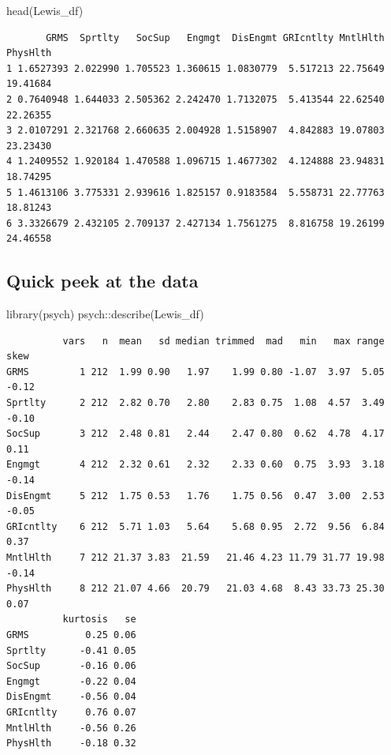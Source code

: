 \documentclass[
  11pt,
]{book}
\newenvironment{Shaded}{\begin{snugshade}}{\end{snugshade}}
\newcommand{\FunctionTok}[1]{\textcolor[rgb]{0.00,0.00,0.00}{#1}}
\newcommand{\NormalTok}[1]{#1}
\newcommand{\SpecialCharTok}[1]{\textcolor[rgb]{0.00,0.00,0.00}{#1}}
\begin{document}
\begin{Shaded}
\begin{Highlighting}[]
\FunctionTok{head}\NormalTok{(Lewis\_df)}
\end{Highlighting}
\end{Shaded}

\begin{verbatim}
       GRMS  Sprtlty   SocSup   Engmgt  DisEngmt GRIcntlty MntlHlth PhysHlth
1 1.6527393 2.022990 1.705523 1.360615 1.0830779  5.517213 22.75649 19.41684
2 0.7640948 1.644033 2.505362 2.242470 1.7132075  5.413544 22.62540 22.26355
3 2.0107291 2.321768 2.660635 2.004928 1.5158907  4.842883 19.07803 23.23430
4 1.2409552 1.920184 1.470588 1.096715 1.4677302  4.124888 23.94831 18.74295
5 1.4613106 3.775331 2.939616 1.825157 0.9183584  5.558731 22.77763 18.81243
6 3.3326679 2.432105 2.709137 2.427134 1.7561275  8.816758 19.26199 24.46558
\end{verbatim}

\hypertarget{quick-peek-at-the-data}{%
\subsection{Quick peek at the data}\label{quick-peek-at-the-data}}

\begin{Shaded}
\begin{Highlighting}[]
\FunctionTok{library}\NormalTok{(psych)}
\NormalTok{psych}\SpecialCharTok{::}\FunctionTok{describe}\NormalTok{(Lewis\_df)}
\end{Highlighting}
\end{Shaded}

\begin{verbatim}
          vars   n  mean   sd median trimmed  mad   min   max range  skew
GRMS         1 212  1.99 0.90   1.97    1.99 0.80 -1.07  3.97  5.05 -0.12
Sprtlty      2 212  2.82 0.70   2.80    2.83 0.75  1.08  4.57  3.49 -0.10
SocSup       3 212  2.48 0.81   2.44    2.47 0.80  0.62  4.78  4.17  0.11
Engmgt       4 212  2.32 0.61   2.32    2.33 0.60  0.75  3.93  3.18 -0.14
DisEngmt     5 212  1.75 0.53   1.76    1.75 0.56  0.47  3.00  2.53 -0.05
GRIcntlty    6 212  5.71 1.03   5.64    5.68 0.95  2.72  9.56  6.84  0.37
MntlHlth     7 212 21.37 3.83  21.59   21.46 4.23 11.79 31.77 19.98 -0.14
PhysHlth     8 212 21.07 4.66  20.79   21.03 4.68  8.43 33.73 25.30  0.07
          kurtosis   se
GRMS          0.25 0.06
Sprtlty      -0.41 0.05
SocSup       -0.16 0.06
Engmgt       -0.22 0.04
DisEngmt     -0.56 0.04
GRIcntlty     0.76 0.07
MntlHlth     -0.56 0.26
PhysHlth     -0.18 0.32
\end{verbatim}
\end{document}
